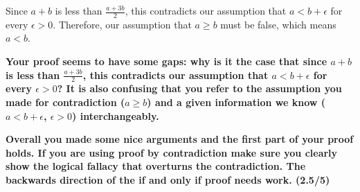 \documentclass{report}
\begin{document}
Since $a+b$ is less than $\frac{a+3 b}{2}$, this contradicts our assumption that $a<b+\epsilon$ for every $\epsilon>0$. Therefore, our assumption that $a \geq b$ must be false, which means $a<b$.
\par
\textbf{Your proof seems to have some gaps: why is it the case that since $a+b$ is less than $\frac{a+3 b}{2}$, this contradicts our assumption that $a<b+\epsilon$ for every $\epsilon>0$?
It is also confusing that you refer to the assumption you made for contradiction ($a \geq b $) and a given information we know ($ a < b + \epsilon$, $\epsilon > 0$) interchangeably.}
\par\textbf{
Overall you made some nice arguments and the first part of your proof holds. If you are using proof by contradiction make sure you clearly show the logical fallacy that overturns the contradiction. The backwards direction of the if and only if proof needs work. (2.5/5)}
\end{document}
